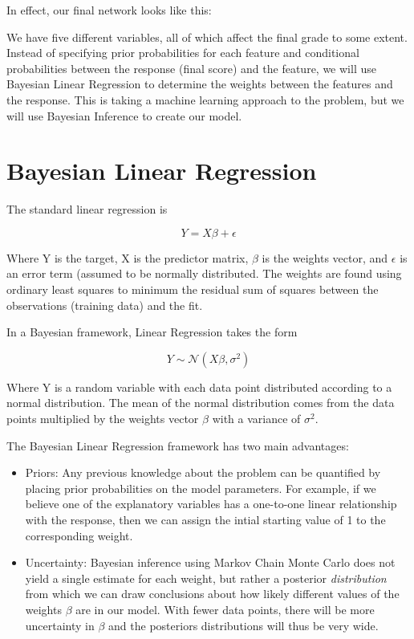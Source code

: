 \documentclass[11pt]{article}
\providecommand{\tightlist}{%
      \setlength{\itemsep}{0pt}\setlength{\parskip}{0pt}}
\begin{document}
In effect, our final network looks like this:

We have five different variables, all of which affect the final grade to
some extent. Instead of specifying prior probabilities for each feature
and conditional probabilities between the response (final score) and the
feature, we will use Bayesian Linear Regression to determine the weights
between the features and the response. This is taking a machine learning
approach to the problem, but we will use Bayesian Inference to create
our model.

\hypertarget{bayesian-linear-regression}{%
\section{Bayesian Linear Regression}\label{bayesian-linear-regression}}

The standard linear regression is

\[ Y = X\beta + \epsilon \]

Where Y is the target, X is the predictor matrix, \(\beta\) is the
weights vector, and \(\epsilon\) is an error term (assumed to be
normally distributed. The weights are found using ordinary least squares
to minimum the residual sum of squares between the observations
(training data) and the fit.

In a Bayesian framework, Linear Regression takes the form

\[ Y \sim \mathcal{N}(X \beta, \sigma^2) \]

Where Y is a random variable with each data point distributed according
to a normal distribution. The mean of the normal distribution comes from
the data points multiplied by the weights vector \(\beta\) with a
variance of \(\sigma^2\).

The Bayesian Linear Regression framework has two main advantages:

\begin{itemize}
\tightlist
\item
  Priors: Any previous knowledge about the problem can be quantified by
  placing prior probabilities on the model parameters. For example, if
  we believe one of the explanatory variables has a one-to-one linear
  relationship with the response, then we can assign the intial starting
  value of 1 to the corresponding weight.
\item
  Uncertainty: Bayesian inference using Markov Chain Monte Carlo does
  not yield a single estimate for each weight, but rather a posterior
  \emph{distribution} from which we can draw conclusions about how
  likely different values of the weights \(\beta\) are in our model.
  With fewer data points, there will be more uncertainty in \(\beta\)
  and the posteriors distributions will thus be very wide.
\end{itemize}
\end{document}
